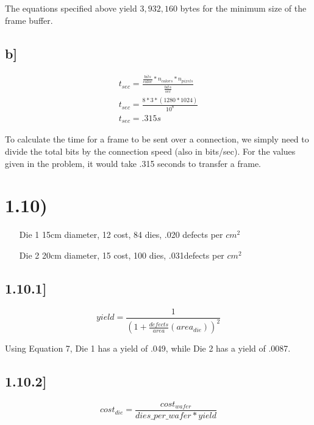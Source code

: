 \documentclass[a4paper,11pt]{article}
\begin{document}
The equations specified above yield $3,932,160$ bytes for the minimum size of the frame buffer.

\subsection*{b] }

\begin{eqnarray}
   t_{sec} = \frac{\frac{bits}{color} * n_{colors} *  n_{pixels}}{ \frac{bits}{sec}} \\
   t_{sec} = \frac{8 * 3 * (1280 * 1024)}{10^{8}} \\
   t_{sec} = .315 s  
\end{eqnarray}

To calculate the time for a frame to be sent over a connection, we simply need to divide the total bits by the connection speed (also in bits/sec).  For the values given in the problem, it would take .315 seconds to transfer a frame.  


\section*{1.10)}
\begin{enumerate}
  \item [Die 1] 15cm diameter, 12 cost, 84 dies, .020 defects per $cm^2$
  \item [Die 2] 20cm diameter, 15 cost, 100 dies, .031defects per $cm^2$
\end{enumerate}

\subsection*{1.10.1]}

\begin{equation}
yield = \frac{1}{(1 + \frac{defects}{area}(area_{die}))^2}
\end{equation}

Using Equation 7, Die 1 has a yield of .049, while Die 2 has a yield of .0087.

\subsection*{1.10.2]}

\begin{equation}
cost_{die} = \frac{cost_{wafer}}{dies\_per\_wafer * yield}
\end{equation}
\end{document}

